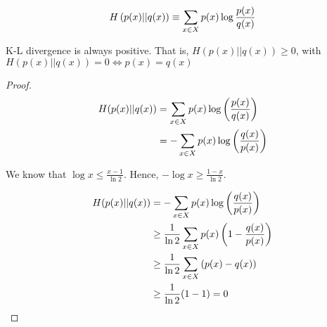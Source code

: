 \begin{align*}
    H \left(p(x) || q(x) \right) \equiv \sum_{x \in X} p(x) \log \frac{p(x)}{q(x)}
\end{align*}

\begin{theorem}
    K-L divergence is always positive. That is, $H(p(x) || q(x)) \geq 0$,
    with $H(p(x) || q(x)) = 0 \iff p(x) = q(x)$
\end{theorem}
\begin{proof}
    \begin{align*}
        H(p(x) || q(x)) 
        &= \sum_{x \in X} p(x) \log \left( \frac{p(x)}{q(x)} \right) \\
        &= - \sum_{x \in X} p(x) \log \left( \frac{q(x)}{p(x)} \right) \\
\end{align*}

We know that $\log x \leq \frac{x - 1}{\ln 2}$.
Hence, $-\log x \geq \frac{1 - x}{\ln 2}$.

\begin{align*}
        H(p(x) || q(x)) 
        &= - \sum_{x \in X} p(x) \log \left( \frac{q(x)}{p(x)} \right) \\
        &\geq \frac{1}{\ln 2} \sum_{x \in X} p(x) \left( 1 - \frac{q(x)}{p(x)} \right) \\
        &\geq \frac{1}{\ln 2} \sum_{x \in X}\left(p(x) - q(x) \right) \\
        &\geq \frac{1}{\ln 2} (1 - 1) = 0 \\
\end{align*}
\end{proof}
